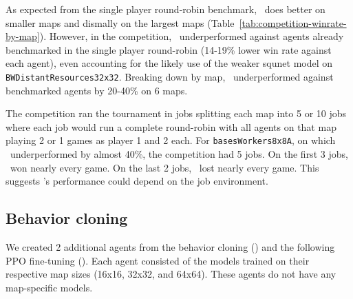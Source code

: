 \documentclass{article}
\begin{document}
As expected from the single player round-robin benchmark, \agentName\ does better on
smaller maps and dismally on the largest maps
(Table~\ref{tab:competition-winrate-by-map}). However, in the competition, \agentName\
underperformed against agents already benchmarked in the single player round-robin
(14-19\% lower win rate against each agent), even accounting for the likely use of
the weaker squnet model on \texttt{BWDistantResources32x32}.  Breaking down by map, 
\agentName\ underperformed against benchmarked agents by 20-40\% on 6 maps.

The competition ran the tournament in jobs splitting each map into 5 or 10 jobs where
each job would run a complete round-robin with all agents on that map playing 2 or 1
games as player 1 and 2 each. For \texttt{basesWorkers8x8A}, on which \agentName\
underperformed by almost 40\%, the competition had 5 jobs. On the first 3 jobs,
\agentName\ won nearly every game. On the last 2 jobs, \agentName\ lost nearly every
game. This suggests \agentName's performance could depend on the job environment.

\subsection{Behavior cloning}
\label{sec:behavior-cloning-results}
We created 2 additional agents from the behavior cloning (\bcAgent) and the following
PPO fine-tuning (\bcPPOAgent). Each agent consisted of the models trained on their
respective map sizes (16x16, 32x32, and 64x64). These agents do not have any
map-specific models.
\end{document}
